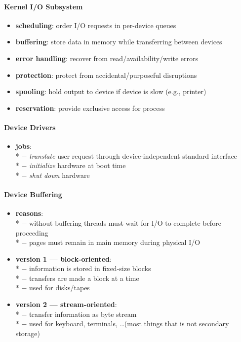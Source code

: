 \paragraph{Kernel I/O Subsystem}
\begin{itemize}
  \item \textbf{scheduling}: order I/O requests in per-device queues
  \item \textbf{buffering}: store data in memory while transferring between devices
  \item \textbf{error handling}: recover from read/availability/write errors
  \item \textbf{protection}: protect from accidental/purposeful disruptions
  \item \textbf{spooling}: hold output to device if device is slow (e.g., printer)
  \item \textbf{reservation}: provide exclusive access for process
\end{itemize}

\paragraph{Device Drivers}
\begin{itemize}
  \item \textbf{jobs}: \\*
    $ - $ \emph{translate} user request through device-independent standard interface \\*
    $ - $ \emph{initialize} hardware at boot time \\*
    $ - $ \emph{shut down} hardware
\end{itemize}

\paragraph{Device Buffering}
\begin{itemize}
  \item \textbf{reasons}: \\*
    $ - $ without buffering threads must wait for I/O to complete before proceeding \\*
    $ - $ pages must remain in main memory during physical I/O
  \item \textbf{version 1 --- block-oriented}: \\*
    $ - $ information is stored in fixed-size blocks \\*
    $ - $ transfers are made a block at a time \\*
    $ - $ used for disks/tapes
  \item \textbf{version 2 --- stream-oriented}: \\*
    $ - $ transfer information as byte stream \\*
    $ - $ used for keyboard, terminals, \dots (most things that is not secondary storage)
\end{itemize}

